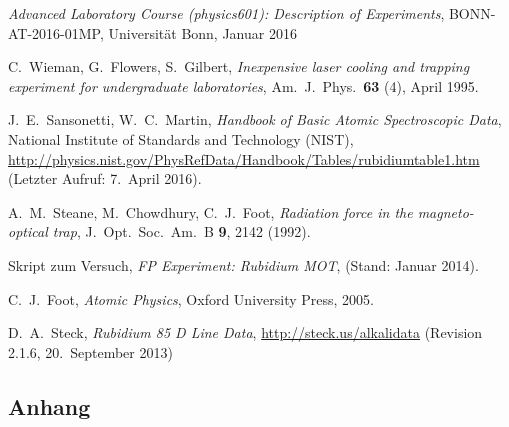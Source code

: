 \documentclass[11pt, a4paper]{article}
\numberwithin{equation}{section}
\begin{document}
\FloatBarrier
\vspace{\fill}
\begin{thebibliography}{19}
	\emph{Advanced Laboratory Course (physics601): Description of Experiments}, BONN-AT-2016-01MP, Universität Bonn, Januar 2016

	C.\ Wieman, G.\ Flowers, S.\ Gilbert,
	\emph{Inexpensive laser cooling and trapping experiment for undergraduate laboratories},
	Am.\ J.\ Phys.\ \textbf{63} (4), April 1995.

	J.\ E.\ Sansonetti, W.\ C.\ Martin,
	\emph{Handbook of Basic Atomic Spectroscopic Data},
	National Institute of Standards and Technology (NIST), \url{http://physics.nist.gov/PhysRefData/Handbook/Tables/rubidiumtable1.htm} (Letzter Aufruf: 7.\ April 2016).

	A.\ M.\ Steane, M.\ Chowdhury, C.\ J.\ Foot,
	\emph{Radiation force in the magneto-optical trap},
	J.\ Opt.\ Soc.\ Am.\ B \textbf{9}, 2142 (1992).

	Skript zum Versuch,
	\emph{FP Experiment: Rubidium MOT},
	(Stand: Januar 2014).

	C.\ J.\ Foot,
	\emph{Atomic Physics},
	Oxford University Press, 2005.
	
	D.\ A.\ Steck,
	\emph{Rubidium 85 D Line Data},
	\url{http://steck.us/alkalidata} (Revision 2.1.6, 20.\ September 2013)
\end{thebibliography}

\begin{appendix}
\newpage
\section{Anhang}
\end{appendix}
\end{document}
